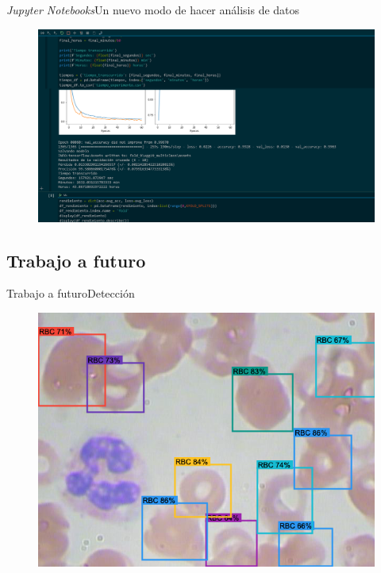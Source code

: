 \documentclass{beamer}
\begin{document}
    \begin{frame}{\emph{Jupyter Notebooks}}{Un nuevo modo de hacer análisis de datos}
        \begin{figure}[]
            \centering
            \includegraphics[width=\textwidth, height=0.95\textheight]{note}
        \end{figure}
    \end{frame}

    \subsection{Trabajo a futuro}

    \begin{frame}{Trabajo a futuro}{Detección}
        \begin{figure}[]
            \centering
            \includegraphics[height=0.95\textheight]{object}
        \end{figure}
    \end{frame}
\end{document}
